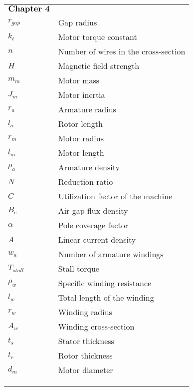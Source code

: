 \begin{tabular}{l@{\hspace{2cm}}l}
  $\textbf{\large Chapter 4}$ & \\
  $r_{gap}$ &  Gap radius\\
  $k_{t}$ &  Motor torque constant\\
  $n$ &  Number of wires in the cross-section\\
  $H$ &  Magnetic field strength\\
  $m_{m}$ & Motor mass\\
  $J_{m}$ & Motor inertia\\
  $r_{a}$ & Armature radius\\
  $l_{a}$ & Rotor length\\
  $r_{m}$ & Motor radius\\
  $l_{m}$ & Motor length\\
  $\rho_{a}$ & Armature density\\
  $N$ & Reduction ratio\\
  $C$ & Utilization factor of the machine\\
  $B_{e}$ & Air gap flux density\\
  $\alpha$ & Pole coverage factor\\
  $A$ & Linear current density\\
  $w_{a}$ & Number of armature windings\\
  $T_{stall}$ & Stall torque\\
  $\rho_{w}$ & Specific winding resistance\\
  $l_{w}$ & Total length of the winding\\
  $r_{w}$ & Winding radius\\
  $A_{w}$ & Winding cross-section\\
  $t_{s}$ & Stator thickness\\
  $t_{r}$ & Rotor thickness\\
  $d_{m}$ & Motor diameter\\
  \tabularnewline
  \tabularnewline
  \tabularnewline
\end{tabular}
\\




\cleardoublepage


